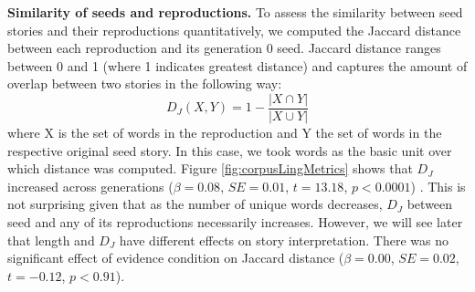 \documentclass[10pt,letterpaper]{article}
\newcommand{\ek}[1]{\textcolor{Orange}{[ek: #1]}}
\newcommand{\mf}[1]{\textcolor{PinkyPurple}{[mf: #1]}}
\begin{document}
\textbf{Similarity of seeds and reproductions.} %
To assess the similarity between seed stories and their reproductions quantitatively, we computed the Jaccard distance between each reproduction and its generation 0 seed. Jaccard distance ranges between 0 and 1 (where 1 indicates greatest distance) and captures the amount of overlap between two stories in the following way: \[D_J(X,Y) = 1 - \frac{|X \cap Y|}{|X \cup Y|}\] where X is the set of words in the reproduction and Y the set of words in the respective original seed story. In this case, we took words as the basic unit over which distance was computed. Figure \ref{fig:corpusLingMetrics} shows that $D_J$ increased across generations ($\beta = 0.08$, $SE = 0.01$, $t = 13.18$, $p < 0.0001$)
. This is not surprising given that as the number of unique words decreases, $D_J$ between seed and any of its reproductions necessarily increases. However, we will see later that length and $D_J$ have different effects on story interpretation. There was no significant effect of evidence condition on Jaccard distance ($\beta = 0.00$, $SE = 0.02$, $t = -0.12$, $p < 0.91$).

\end{document}
